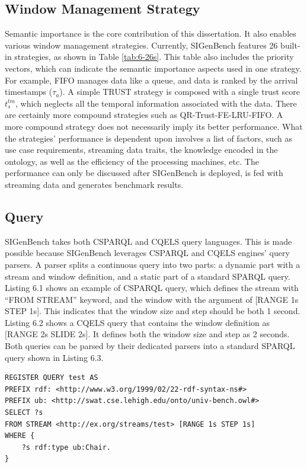 \subsection{Window Management Strategy}
Semantic importance is the core contribution of this dissertation.
It also enables various window management strategies.
Currently, SIGenBench features 26 built-in strategies, as shown in Table \ref{tab:6-26s}.
This table also includes the priority vectors, which can indicate the semantic importance aspects used in one strategy. 
For example, FIFO manages data like a queue, and data is ranked by the arrival timestamps ($\tau_{a}$). 
A simple TRUST strategy is composed with a single trust score $t^{tm}_{s}$, which neglects all the temporal information associated with the data. 
There are certainly more compound strategies such as QR-Trust-FE-LRU-FIFO. 
A more compound strategy does not necessarily imply its better performance.
What the strategies' performance is dependent upon involves a list of factors, such as use case requirements, streaming data traits, the knowledge encoded in the ontology, as well as the efficiency of the processing machines, etc.
The performance can only be discussed after SIGenBench is deployed, is fed with streaming data and generates benchmark results. 
%
\subsection{Query}
SIGenBench takes both CSPARQL and CQELS query languages. 
This is made possible because SIGenBench leverages CSPARQL and CQELS engines' query parsers.
A parser splits a continuous query into two parts: a dynamic part with a stream and window definition, and a static part of a standard SPARQL query. 
Listing 6.1 shows an example of CSPARQL query, which defines the stream with ``FROM STREAM'' keyword, and the window with the argument of [RANGE 1s STEP 1s].
This indicates that the window size and step should be both 1 second.
Listing 6.2 shows a CQELS query that contains the window definition as [RANGE 2s SLIDE 2s].
It defines both the window size and step as 2 seconds.
Both queries can be parsed by their dedicated parsers into a standard SPARQL query shown in Listing 6.3.

\begin{lstlisting}[caption={\textbf{CSPARQL Query Example}},basicstyle=\small]
REGISTER QUERY test AS
PREFIX rdf: <http://www.w3.org/1999/02/22-rdf-syntax-ns#>
PREFIX ub: <http://swat.cse.lehigh.edu/onto/univ-bench.owl#>
SELECT ?s
FROM STREAM <http://ex.org/streams/test> [RANGE 1s STEP 1s]
WHERE {	
	?s rdf:type ub:Chair.
}
\end{lstlisting}

